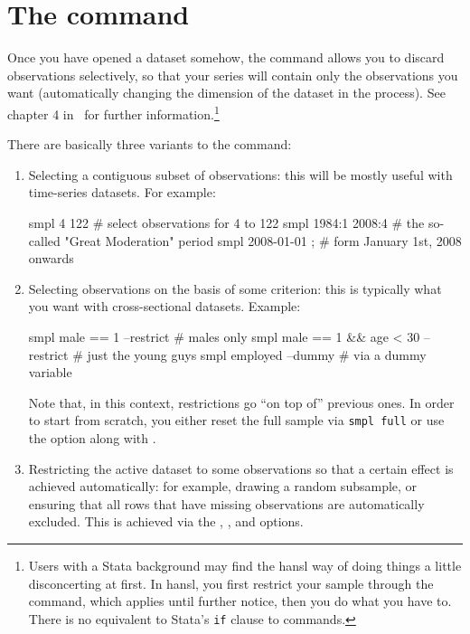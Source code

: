 \section{The  command}

Once you have opened a dataset somehow, the  command allows
you to discard observations selectively, so that your series will
contain only the observations you want (automatically changing the
dimension of the dataset in the process). See chapter 4 in \GUG\ for
further information.\footnote{Users with a Stata background may find
  the hansl way of doing things a little disconcerting at first. In
  hansl, you first restrict your sample through the 
  command, which applies until further notice, then you do what you
  have to. There is no equivalent to Stata's \texttt{if} clause to
  commands.}

There are basically three variants to the  command:
\begin{enumerate}
\item Selecting a contiguous subset of observations: this will be
  mostly useful with time-series datasets. For example:
  \begin{code}
    smpl 4 122            # select observations for 4 to 122
    smpl 1984:1 2008:4    # the so-called "Great Moderation" period
    smpl 2008-01-01 ;     # form January 1st, 2008 onwards
  \end{code}
\item Selecting observations on the basis of some criterion: this is
  typically what you want with cross-sectional datasets. Example:
  \begin{code}
    smpl male == 1 --restrict                # males only
    smpl male == 1 && age < 30 --restrict    # just the young guys
    smpl employed --dummy                    # via a dummy variable
  \end{code}
  Note that, in this context, restrictions go ``on top of'' previous
  ones. In order to start from scratch, you either reset the full
  sample via \texttt{smpl full} or use the  option
  along with .
\item Restricting the active dataset to some observations so that a
  certain effect is achieved automatically: for example, drawing a
  random subsample, or ensuring that all rows that have missing
  observations are automatically excluded. This is achieved via the
  , , and 
  options.
\end{enumerate}

